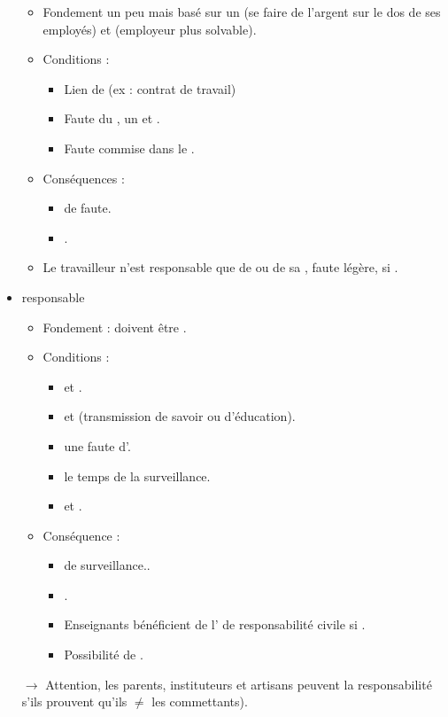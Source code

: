 \begin{itemize}
	\begin{itemize}
		\item Fondement un peu  mais basé sur un  (se faire de l'argent sur le dos de ses employés) et  (employeur plus solvable).
		\item Conditions :
		\begin{itemize}
			\item Lien de  (ex : contrat de travail)
			\item Faute du , un  et .
			\item Faute commise dans le .
		\end{itemize}
		\item Conséquences :
		\begin{itemize}
			\item {} de faute.
			\item {}.
		\end{itemize}
		\item Le travailleur n'est responsable que de  ou de sa , faute légère, si .
	\end{itemize}
	\item {} responsable 
	\begin{itemize}
		\item Fondement : doivent être .
		\item Conditions :
		\begin{itemize}
			\item {} et .
			\item {} et  (transmission de savoir ou d'éducation).
			\item une faute d'.
			\item {} le temps de la surveillance.
			\item {} et .
		\end{itemize}
		\item Conséquence :
		\begin{itemize}
			\item {} de surveillance..
			\item {}.
			\item Enseignants bénéficient de l' de responsabilité civile si .
			\item Possibilité de .
		\end{itemize}		
	\end{itemize}
	$\rightarrow$ Attention, les parents, instituteurs et artisans peuvent  la responsabilité s'ils prouvent qu'ils  $\neq$ les commettants).
\end{itemize}

